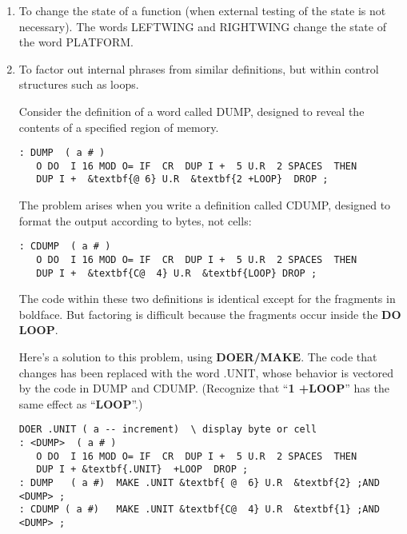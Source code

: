 \begin{enumerate}
\item To change the state of a function (when external testing of the state is not
necessary). The words LEFTWING and RIGHTWING change the state of
the word PLATFORM.

\item To factor out internal phrases from similar definitions, but within control
structures such as loops.

Consider the definition of a word called DUMP, designed to reveal the
contents of a specified region of memory.


\begin{Verbatim}[commandchars=\&\{\}]
: DUMP  ( a # )
   O DO  I 16 MOD O= IF  CR  DUP I +  5 U.R  2 SPACES  THEN
   DUP I +  &textbf{@ 6} U.R  &textbf{2 +LOOP}  DROP ;
\end{Verbatim}

The problem arises when you write a definition called CDUMP, designed to
format the output according to bytes, not cells:

\begin{Verbatim}[commandchars=\&\{\}]
: CDUMP  ( a # )
   O DO  I 16 MOD O= IF  CR  DUP I +  5 U.R  2 SPACES  THEN
   DUP I +  &textbf{C@  4} U.R  &textbf{LOOP} DROP ;
\end{Verbatim}


The code within these two definitions is identical except for the fragments
in boldface. But factoring is difficult because the fragments occur inside the
\textbf{DO LOOP}.

Here's a solution to this problem, using \textbf{DOER/MAKE}. The code that
changes has been replaced with the word .UNIT, whose behavior is vectored
by the code in DUMP and CDUMP. (Recognize that ``\textbf{1 +LOOP}'' has
the same effect as ``\textbf{LOOP}''.)

\begin{Verbatim}[commandchars=\&\{\}]
DOER .UNIT ( a -- increment)  \ display byte or cell
: <DUMP>  ( a # )
   O DO  I 16 MOD O= IF  CR  DUP I +  5 U.R  2 SPACES  THEN
   DUP I + &textbf{.UNIT}  +LOOP  DROP ;
: DUMP   ( a #)  MAKE .UNIT &textbf{ @  6} U.R  &textbf{2} ;AND <DUMP> ;
: CDUMP ( a #)   MAKE .UNIT &textbf{C@  4} U.R  &textbf{1} ;AND <DUMP> ;
\end{Verbatim}


\end{enumerate}
